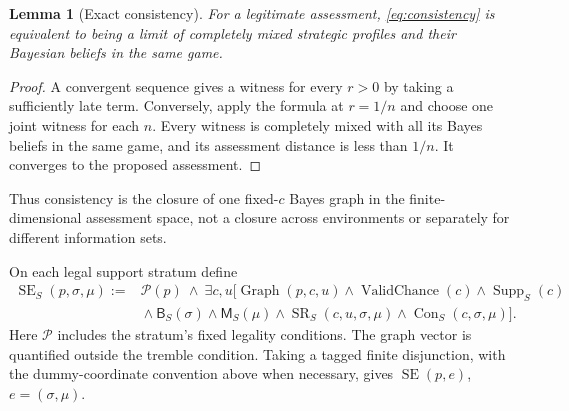 \documentclass[11pt,a4paper]{article}
\numberwithin{equation}{section}
\newtheorem{lemma}[theorem]{Lemma}
\theoremstyle{definition}
\DeclareMathOperator{\SE}{SE}
\DeclareMathOperator{\Graph}{Graph}
\DeclareMathOperator{\SR}{SR}
\DeclareMathOperator{\Con}{Con}
\begin{document}
\begin{lemma}[Exact consistency]\label{lem:consistency}
For a legitimate assessment, \eqref{eq:consistency} is equivalent to
being a limit of completely mixed strategic profiles and their
Bayesian beliefs in the same game.
\end{lemma}
\begin{proof}
A convergent sequence gives a witness for every \(r>0\) by taking a
sufficiently late term. Conversely, apply the formula at \(r=1/n\)
and choose one joint witness for each \(n\).
Every witness is completely mixed with all its Bayes beliefs in the
same game, and its assessment distance is less than \(1/n\).
It converges to the proposed assessment.
\end{proof}
Thus consistency is the closure of one fixed-\(c\) Bayes graph in
the finite-dimensional assessment space, not a closure across
environments or separately for different information sets.

On each legal support stratum define
\begin{equation}\label{eq:SE}
 \begin{split}
 \SE_S(p,\sigma,\mu):={}&\mathcal P(p)\ \wedge\
 \exists c,u\bigl[
   \Graph(p,c,u)\wedge\operatorname{ValidChance}(c)
      \wedge\operatorname{Supp}_S(c)\\
 &{}\wedge\mathsf B_S(\sigma)\wedge\mathsf M_S(\mu)
      \wedge\SR_S(c,u,\sigma,\mu)\wedge\Con_S(c,\sigma,\mu)
 \bigr].
 \end{split}
\end{equation}
Here \(\mathcal P\) includes the stratum's fixed legality conditions.
The graph vector is quantified outside the tremble condition.
Taking a tagged finite disjunction, with the dummy-coordinate convention
above when necessary, gives \(\SE(p,e)\), \(e=(\sigma,\mu)\).
\end{document}
